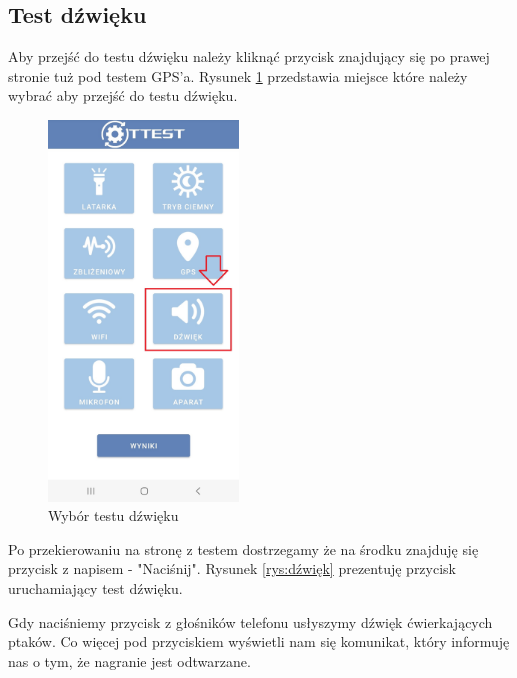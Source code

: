 \newpage


\subsection{Test dźwięku}

\hspace{0.60cm}Aby przejść do testu dźwięku należy kliknąć przycisk znajdujący się po prawej stronie tuż pod testem GPS'a. Rysunek \ref{rys:menu5} przedstawia miejsce które należy wybrać aby przejść do testu dźwięku.

\begin{figure}[!hbt]
	\begin{center}
		\includegraphics[angle=360, width=0.45\textwidth]{rys/punkt6/menu5}
		\caption{Wybór testu dźwięku}
		\label{rys:menu5}
	\end{center}
\end{figure}

Po przekierowaniu na stronę z testem dostrzegamy że na środku znajduję się przycisk z napisem - "Naciśnij". Rysunek \ref{rys:dźwięk} prezentuję przycisk uruchamiający test dźwięku.

Gdy naciśniemy przycisk z głośników telefonu usłyszymy dźwięk ćwierkających ptaków. Co więcej pod przyciskiem wyświetli nam się komunikat, który informuję nas o tym, że nagranie jest odtwarzane. 

\newpage

